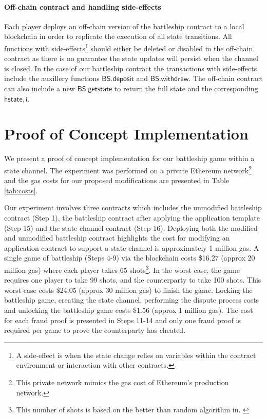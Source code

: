 \documentclass{llncs}
\newcommand{\instantiatedyes}{\mathsf{YES}}
\newcommand{\hstate}{\mathsf{hstate}}
\newcommand{\monotoniccounter}{\mathsf{i}}
\newcommand{\battleshipdeposit}{\mathsf{BS.deposit}}
\newcommand{\battleshipwithdraw}{\mathsf{BS.withdraw}}
\newcommand{\battleshipgetstate}{\mathsf{BS.getstate}}
\begin{document}
\paragraph{Off-chain contract and handling side-effects} \label{sec:timers}

Each player deploys an off-chain version of the battleship contract to a local blockchain in order to replicate the execution of all state transitions. 
All functions with side-effects\footnote{A side-effect is when the state change relies on variables within the contract environment or interaction with other contracts. } should either be deleted or disabled in the off-chain contract as there is no guarantee the state updates will persist when the channel is closed. 
In the case of our battleship contract the transactions with side-effects include the auxillery functions $\battleshipdeposit$ and $\battleshipwithdraw$. 
The off-chain contract can also include a new $\battleshipgetstate$ to return the full state and the corresponding $\hstate,\monotoniccounter$. 

\section{Proof  of Concept Implementation}

We present a proof of concept implementation for our battleship game within a state channel.
The experiment was performed on a private Ethereum network\footnote{This private network mimics the gas cost of Ethereum's production network.} and the gas costs for our proposed modifications are presented in Table \ref{tab:costs}. 

Our experiment involves three contracts which includes the unmodified battleship contract (Step 1), the battleship contract after applying the application template (Step 15) and the state channel contract (Step 16). 
Deploying both the modified and unmodified battleship contract highlights the cost for modifying an application contract to support a state channel is approximately 1 million gas. 
A single game of battleship (Steps 4-9) via the blockchain costs \$16.27 (approx 20 million gas) where each player takes 65 shots\footnote{This number of shots is based on the better than random algorithm in. \cite{battleshipdata}}.
In the worst case, the game requires one player to take 99 shots, and the counterparty to take 100 shots. 
This worst-case costs \$24.05 (approx 30 million gas) to finish the game.  
Locking the battleship game, creating the state channel, performing the dispute process costs and unlocking the battleship game costs \$1.56 (approx 1 million gas). 
The cost for each fraud proof is presented in Steps 11-14 and only one fraud proof is required per game to prove the counterparty has cheated. 
\end{document}
